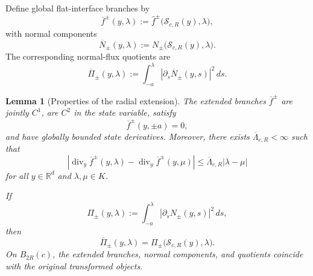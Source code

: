 \documentclass[11pt]{amsart}
\numberwithin{equation}{section}
\theoremstyle{plain}
\newtheorem{lemma}[theorem]{Lemma}
\theoremstyle{definition}
\theoremstyle{remark}
\begin{document}
Define global flat-interface branches by
\begin{equation}
\label{eq:general-extended-fluxes}
    \overline f^\pm(y,\lambda)
    :=
    \widehat f^\pm
    \bigl(\mathcal S_{c,R}(y),\lambda\bigr),
\end{equation}
with normal components
\begin{equation}
\label{eq:general-extended-normal-fluxes}
    \overline N_\pm(y,\lambda)
    :=
    N_\pm
    \bigl(\mathcal S_{c,R}(y),\lambda\bigr).
\end{equation}
The corresponding normal-flux quotients are
\begin{equation}
\label{eq:general-extended-quotients}
    \overline\Pi_\pm(y,\lambda)
    :=
    \int_{-a}^{\lambda}
        \left|
            \partial_s\overline N_\pm(y,s)
        \right|^2
    \,ds.
\end{equation}

\begin{lemma}[Properties of the radial extension]
\label{lem:general-radial-extension}
The extended branches \(\overline f^\pm\) are jointly \(C^1\), are
\(C^2\) in the state variable, satisfy
\[
    \overline f^\pm(y,\pm a)=0,
\]
and have globally bounded state derivatives. Moreover, there exists
\(\overline\Lambda_{c,R}<\infty\) such that
\begin{equation}
\label{eq:general-extended-divergence-lipschitz}
\left|
    \operatorname{div}_y\overline f^\pm(y,\lambda)
    -
    \operatorname{div}_y\overline f^\pm(y,\mu)
\right|
\le
\overline\Lambda_{c,R}|\lambda-\mu|
\end{equation}
for all \(y\in\mathbb R^d\) and \(\lambda,\mu\in K\).

If
\begin{equation}
\label{eq:general-interior-chart-quotient}
    \Pi_\pm(y,\lambda)
    :=
    \int_{-a}^{\lambda}
        \left|
            \partial_sN_\pm(y,s)
        \right|^2
    \,ds,
\end{equation}
then
\begin{equation}
\label{eq:general-extended-quotient-identity}
    \overline\Pi_\pm(y,\lambda)
    =
    \Pi_\pm
    \bigl(\mathcal S_{c,R}(y),\lambda\bigr).
\end{equation}
On \(B_{2R}(c)\), the extended branches, normal components, and quotients
coincide with the original transformed objects.
\end{lemma}
\end{document}
